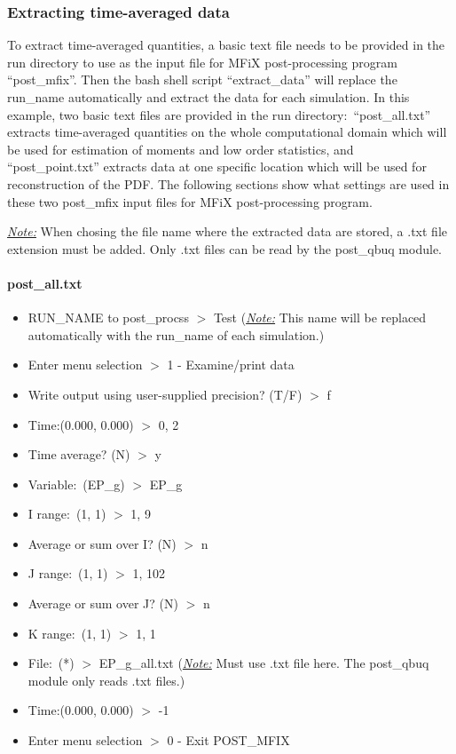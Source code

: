 \documentclass[a4paper,12pt,titlepage]{article}
\newcommand{\MFIX}{MFiX }
\begin{document}
\subsubsection{Extracting time-averaged data}
\label{sec:ExtractData}

To extract time-averaged quantities, a basic text file needs to be provided in
the run directory to use as the input file for \MFIX post-processing program
``post\_mfix''. Then the bash shell script ``extract\_data'' will replace the
run\_name automatically and extract the data for each simulation. In this
example, two basic text files are provided in the run directory:\
``post\_all.txt'' extracts time-averaged quantities on the whole computational
domain which will be used for estimation of moments and low order statistics,
and \\``post\_point.txt'' extracts data at one specific location which will be
used for reconstruction of the PDF. The following sections show what settings
are used in these two post\_mfix input files for \MFIX post-processing program.

\emph{\underline{Note:}} When chosing the file name where the extracted data are
stored, a .txt file extension must be added. Only .txt files can be read by the
post\_qbuq module.

\paragraph*{post\_all.txt}

\begin{itemize}
 \item RUN\_NAME to post\_procss $>$ Test (\emph{\underline{Note:}} This name 
 will be replaced automatically with the run\_name of each simulation.)
 \item Enter menu selection $>$ 1 - Examine/print data
 \item Write output using user-supplied precision? (T/F) $>$ f
 \item Time:(0.000, 0.000) $>$ 0, 2
 \item Time average? (N) $>$ y
 \item Variable:\ (EP\_g) $>$ EP\_g
 \item I range:\ (1, 1) $>$ 1, 9
 \item Average or sum over I? (N) $>$ n
 \item J range:\ (1, 1) $>$ 1, 102
 \item Average or sum over J? (N)  $>$ n
 \item K range:\ (1, 1) $>$ 1, 1
 \item File:\ (*) $>$ EP\_g\_all.txt (\emph{\underline{Note:}} Must use .txt 
 file here. The post\_qbuq module only reads .txt files.)
 \item Time:(0.000, 0.000) $>$ -1
 \item Enter menu selection $>$ 0 - Exit POST\_MFIX
\end{itemize}
\end{document}
